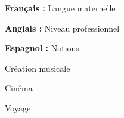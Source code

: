 \documentclass{article}
\begin{document}
\begin{cv}[profile][1.9]
\begin{cvitem}
    \textbf{Français :} Langue maternelle
\end{cvitem}

\cvseparator
\begin{cvitem}
    \textbf{Anglais :} Niveau professionnel
\end{cvitem}

\cvseparator
\begin{cvitem}
    \textbf{Espagnol :} Notions
\end{cvitem}

\begin{cvitem}
    Création musicale
\end{cvitem}

\cvseparator
\begin{cvitem}
    Cinéma
\end{cvitem}

\cvseparator
\begin{cvitem}
    Voyage
\end{cvitem}

\end{cv}
\end{document}
